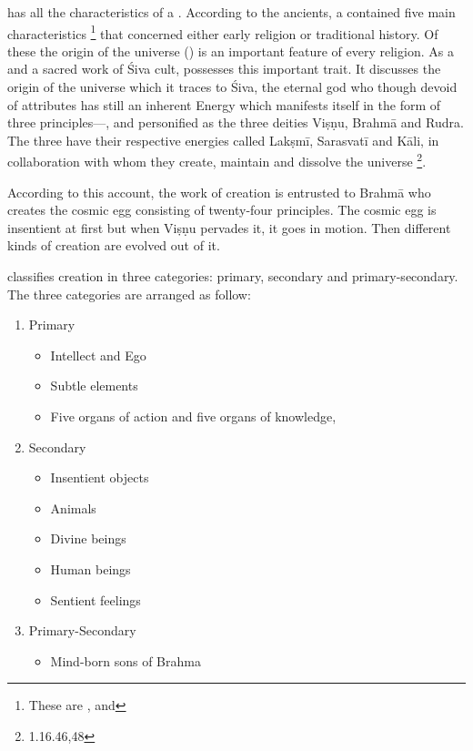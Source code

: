  has all the characteristics of a . According to
the ancients, a  contained five main characteristics
\footnote{These are , and
} that concerned either early religion or traditional history.
Of these the origin of the universe () is an important feature of
every religion. As a  and a sacred work of Śiva cult,
 possesses this important trait. It discusses the origin of
the universe which it traces to Śiva, the eternal god who though devoid of
attributes has still an inherent Energy which manifests itself in the form of
three principles—,  and  personified as the
three deities Viṣṇu, Brahmā and Rudra. The three have their respective energies
called Lakṣmī, Sarasvatī and Kāli, in collaboration with whom they create,
maintain and dissolve the universe \footnote{ 1.16.46,48}.

According to this account, the work of creation is entrusted to Brahmā who
creates the cosmic egg consisting of twenty-four principles. The cosmic egg is
insentient at first but when Viṣṇu pervades it, it goes in motion. Then
different kinds of creation are evolved out of it.

 classifies creation in three categories: primary, secondary and
primary-secondary. The three categories are arranged as follow:

\begin{enumerate}[nosep]
  \item Primary
  \begin{itemize}
    \item Intellect and Ego
    \item Subtle elements
    \item Five organs of action and five organs of knowledge, 
  \end{itemize}
  \item Secondary
  \begin{itemize}
    \item Insentient objects
    \item Animals
    \item Divine beings
    \item Human beings
    \item Sentient feelings
  \end{itemize}
  \item Primary-Secondary
  \begin{itemize}
    \item Mind-born sons of Brahma
  \end{itemize}
\end{enumerate}

